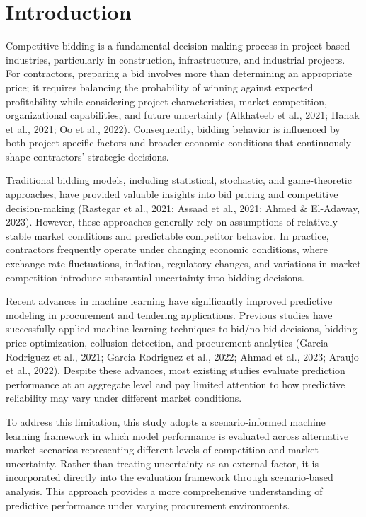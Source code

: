 \documentclass[twoside]{article}
\begin{document}
\section{Introduction}

Competitive bidding is a fundamental decision-making process in project-based industries, particularly in construction, infrastructure, and industrial projects. For contractors, preparing a bid involves more than determining an appropriate price; it requires balancing the probability of winning against expected profitability while considering project characteristics, market competition, organizational capabilities, and future uncertainty (Alkhateeb et al., 2021; Hanak et al., 2021; Oo et al., 2022). Consequently, bidding behavior is influenced by both project-specific factors and broader economic conditions that continuously shape contractors' strategic decisions.

Traditional bidding models, including statistical, stochastic, and game-theoretic approaches, have provided valuable insights into bid pricing and competitive decision-making (Rastegar et al., 2021; Assaad et al., 2021; Ahmed \& El-Adaway, 2023). However, these approaches generally rely on assumptions of relatively stable market conditions and predictable competitor behavior. In practice, contractors frequently operate under changing economic conditions, where exchange-rate fluctuations, inflation, regulatory changes, and variations in market competition introduce substantial uncertainty into bidding decisions.

Recent advances in machine learning have significantly improved predictive modeling in procurement and tendering applications. Previous studies have successfully applied machine learning techniques to bid/no-bid decisions, bidding price optimization, collusion detection, and procurement analytics (Garcia Rodriguez et al., 2021; Garcia Rodriguez et al., 2022; Ahmad et al., 2023; Araujo et al., 2022). Despite these advances, most existing studies evaluate prediction performance at an aggregate level and pay limited attention to how predictive reliability may vary under different market conditions.

To address this limitation, this study adopts a scenario-informed machine learning framework in which model performance is evaluated across alternative market scenarios representing different levels of competition and market uncertainty. Rather than treating uncertainty as an external factor, it is incorporated directly into the evaluation framework through scenario-based analysis. This approach provides a more comprehensive understanding of predictive performance under varying procurement environments.
\end{document}

